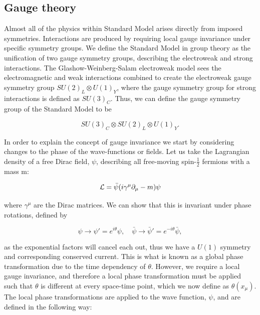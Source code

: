 \subsection{Gauge theory}

Almost all of the physics within Standard Model arises directly from imposed symmetries. Interactions are produced by requiring local gauge 
invariance under specific symmetry groups. We define the Standard Model in group theory as the unification of two gauge symmetry groups, 
describing the electroweak and strong interactions. The Glashow-Weinberg-Salam electroweak model sees the electromagnetic and weak interactions 
combined to create the electroweak gauge symmetry group $SU(2)_L \otimes U(1)_Y$, where the gauge symmetry group for strong interactions is 
defined as $SU(3)_C$. Thus, we can define the gauge symmetry group of the Standard Model to be 

\begin{equation}
SU(3)_C \otimes SU(2)_L \otimes U(1)_Y.
\end{equation}

In order to explain the concept of gauge invariance we start by considering changes to the phase of the wave-functions or fields. Let us take 
the Lagrangian density of a free Dirac field, $\psi$, describing all free-moving spin-$\frac{1}{2}$ fermions with a mass m:  

\begin{equation} \label{eqn-DiracLagrangian}
\mathcal{L} = \bar{\psi}(i \gamma^{\mu}\partial_{\mu}-m)\psi
\end{equation}

where $\gamma^{\mu}$ are the Dirac matrices. We can show that this is invariant under phase rotations, defined by

\begin{equation}
\psi \to \psi'= e^{i \theta}\psi, \quad \bar{\psi} \to \bar{\psi}' = e^{- i \theta}\bar{\psi},
\end{equation}

as the exponential factors will cancel each out, thus we have a $U(1)$ symmetry and corresponding conserved current. This is what is known as a 
global phase transformation due to the time dependency of $\theta$. However, we require a local gauge invariance, and therefore a local phase 
transformation must be applied such that $\theta$ is different at every space-time point, which we now define as $\theta (x_{\mu})$. The local 
phase transformations are applied to the wave function, $\psi$, and are defined in the following way:

